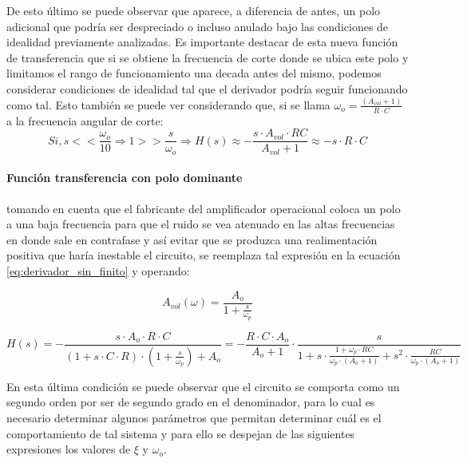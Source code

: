 De esto \'ultimo se puede observar que aparece, a diferencia de antes, un polo adicional que podr\'ia ser despreciado o incluso anulado bajo las condiciones de idealidad previamente analizadas. Es importante destacar de esta nueva funci\'on de transferencia que si se obtiene la frecuencia de corte donde se ubica este polo y limitamos el rango de funcionamiento una decada antes del mismo, podemos considerar condiciones de idealidad tal que el derivador podr\'ia seguir funcionando como tal. Esto tambi\'en se puede ver considerando que, si se llama $\omega_o = \frac{(A_{vol} + 1)}{R \cdot C}$ a la frecuencia angular de corte:
\begin{equation}
	Si, s << \frac{\omega_o}{10} \Rightarrow 1 >> \frac{s}{\omega_o} \Rightarrow 
	H(s) \approx - \frac{s \cdot A_{vol} \cdot RC}{A_{vol} + 1} \approx
	- s \cdot R \cdot C
\end{equation}


\paragraph*{Funci\'on transferencia con polo dominante}tomando en cuenta que el fabricante del amplificador operacional coloca un polo a una baja frecuencia para que el ruido se vea atenuado en las altas frecuencias en donde sale en contrafase y as\'i evitar que se produzca una realimentaci\'on positiva que har\'ia inestable el circuito, se reemplaza tal expresi\'on en la ecuaci\'on \ref{eq:derivador_sin_finito} y operando:

\begin{equation}
	A_{vol}(\omega) = \frac{A_o}{1 + \frac{s}{\omega_p}}
	\label{eq:polo_dominante}
\end{equation}

\begin{equation}
	H(s) = - \frac{s \cdot A_{o} \cdot R \cdot C}{(1 + s \cdot C \cdot R) \cdot (1 + \frac{s}{\omega_p}) + A_{o}} = - \frac{R \cdot C \cdot A_{o}}{A_{o} + 1} \cdot \frac{s}{1 + s \cdot \frac{1 + \omega_p \cdot RC}{\omega_p \cdot(A_o + 1)} + s^{2} \cdot \frac{RC}{\omega_p \cdot (A_o + 1)}}
\end{equation}

En esta \'ultima condici\'on se puede observar que el circuito se comporta como un segundo orden por ser de segundo grado en el denominador, para lo cual es necesario determinar algunos par\'ametros que permitan determinar cu\'al es el comportamiento de tal sistema y para ello se despejan de las siguientes expresiones los valores de $\xi$ y $\omega_o$.

